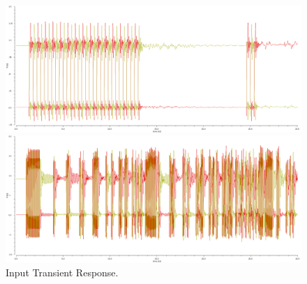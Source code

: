 \documentclass{book}  %
\begin{document}
\begin{paper}
\begin{figure}[htbp!]
	\centering	
	\begin{minipage}[tb]{0.5\textwidth}
		\centering	
		\includegraphics[height=0.15\textheight]{./img/channel_response_eye_diagram/input_transient_response_3gbp.png}
	\end{minipage}%
	\begin{minipage}[tb]{0.5\textwidth}
		\centering	
		\includegraphics[height=0.15\textheight]{./img/channel_response_eye_diagram/input_transient_response_20gbp.png}
	\end{minipage}
	\caption{Input Transient Response.}
	\label{fig:input_transient_response}
\end{figure}


\end{paper}
\end{document}
